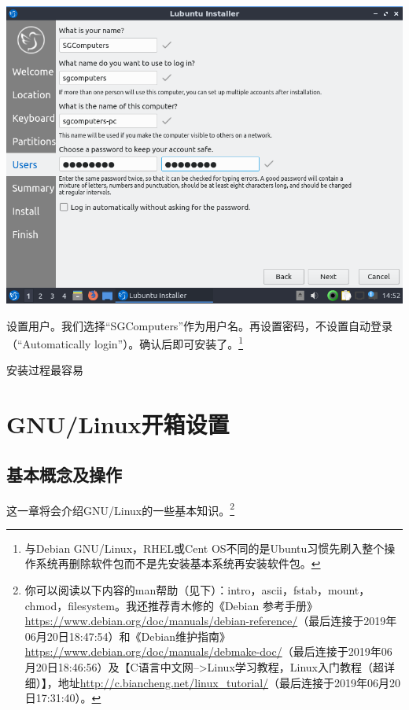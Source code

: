 \documentclass{book}
\begin{document}
\begin{center}
	\includegraphics[scale=0.6]{pic/lubinst12}
\end{center}
设置用户。我们选择“SGComputers”作为用户名。再设置密码，不设置自动登录（“Automatically login”）。确认后即可安装了。\footnote{与Debian GNU/Linux，RHEL或Cent OS不同的是Ubuntu习惯先刷入整个操作系统再删除软件包而不是先安装基本系统再安装软件包。}\par
安装过程最容易
\section{GNU/Linux开箱设置}
\subsection{基本概念及操作}
这一章将会介绍GNU/Linux的一些基本知识。\footnote{你可以阅读以下内容的man帮助（见下）：intro，ascii，fstab，mount，chmod，filesystem。我还推荐青木修的《Debian 参考手册》\url{https://www.debian.org/doc/manuals/debian-reference/}（最后连接于2019年06月20日18:47:54）和《Debian维护指南》\url{https://www.debian.org/doc/manuals/debmake-doc/}（最后连接于2019年06月20日18:46:56）及【C语言中文网-->Linux学习教程，Linux入门教程（超详细）】，地址\url{http://c.biancheng.net/linux_tutorial/}（最后连接于2019年06月20日17:31:40）。}\par
\end{document}
